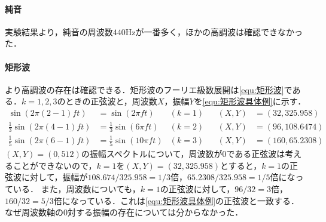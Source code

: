 \paragraph{純音}実験結果より，純音の周波数\(440\textrm{Hz}\)が一番多く，ほかの高調波は確認できなかった．
\paragraph{矩形波}より高調波の存在は確認できる．矩形波のフーリエ級数展開は\eqref{equ:矩形波}である．\(k=1,2,3\)のときの正弦波と，周波数\(X\)，振幅\(Y\)を\eqref{equ:矩形波具体例}に示す．
\begin{equation}
    \begin{aligned}
        \sin(2\pi(2-1)ft)            & =\sin(2\pi ft)             & (k=1) &  & (X,Y) & =(32,325.958)  \\
        \frac{1}{3}\sin(2\pi(4-1)ft) & =\frac{1}{3}\sin(6\pi ft)  & (k=2) &  & (X,Y) & =(96,108.6474) \\
        \frac{1}{5}\sin(2\pi(6-1)ft) & =\frac{1}{5}\sin(10\pi ft) & (k=3) &  & (X,Y) & =(160,65.2308)
    \end{aligned}\label{equ:矩形波具体例}
\end{equation}
\((X,Y)=(0,512)\)の振幅スペクトルについて，周波数が\(0\)である正弦波は考えることができないので，\(k=1\)を\((X,Y)=(32,325.958)\)とすると，\(k=1\)の正弦波に対して，振幅が\(108.674/325.958=1/3\)倍，\(65.2308/325.958=1/5\)倍になっている．
また，周波数についても，\(k=1\)の正弦波に対して，\(96/32=3\)倍，\(160/32=5/3\)倍になっている．これは\eqref{equ:矩形波具体例}の正弦波と一致する．なぜ周波数軸の\(0\)対する振幅の存在については分からなかった．
